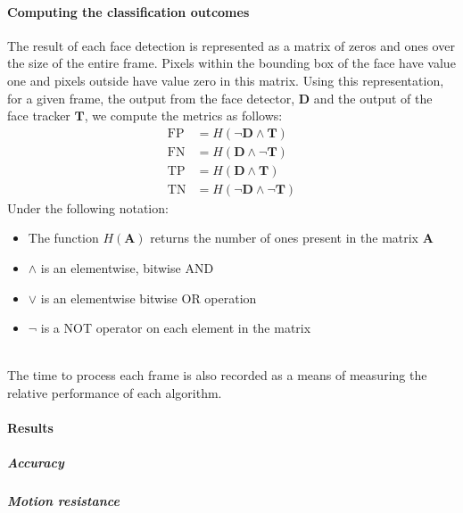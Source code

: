 \paragraph{Computing the classification outcomes} The result of each face detection is represented as a matrix of zeros and ones over the size of the entire frame.
Pixels within the bounding box of the face have value one and pixels outside have value zero in this matrix. Using this representation, for a given frame, the output from the face detector, $\mathbf{D}$ and the output of the face tracker $\mathbf{T}$, we compute the metrics as follows: 
\begin{align*}
    \mathrm{FP} &= H(\neg{\mathbf{D}} \wedge \mathbf{T}) \\
    \mathrm{FN} &= H(\mathbf{D} \wedge \neg{\mathbf{T}})\\
    \mathrm{TP} &= H(\mathbf{D} \wedge \mathbf{T})\\
    \mathrm{TN} &= H(\neg{\mathbf{D}} \wedge \neg{\mathbf{T}})
\end{align*}
Under the following notation: 
\begin{itemize}
    \item The function $H(\mathbf{A})$ returns the number of ones present in the matrix $\mathbf{A}$
    \item $\wedge$ is an elementwise, bitwise AND 
    \item $\vee$ is an elementwise bitwise OR operation 
    \item $\neg$ is a NOT operator on each element in the matrix
\\\\
\end{itemize}
The time to process each frame is also recorded as a means of measuring the relative performance of each algorithm.

\paragraph{Results}

\subparagraph{Accuracy}
\subparagraph{Motion resistance}


